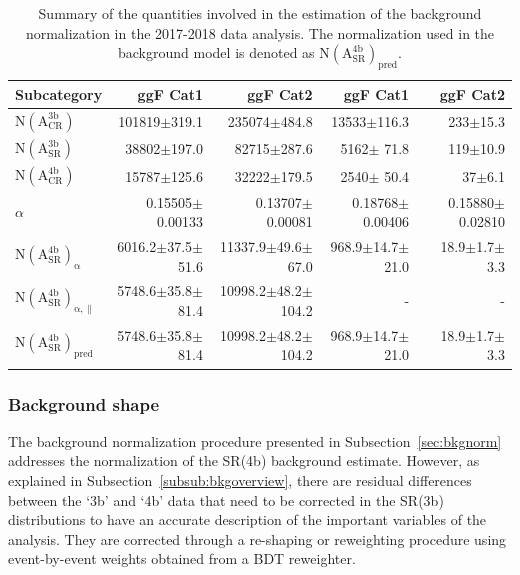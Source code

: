 \begin{table}[htb!]
\caption[Summary of the quantities involved in the estimation of the background normalization in the 2017-2018 data analysis]{\label{bkg:tab:factor2} Summary of the quantities involved in the estimation of the background normalization in the 2017-2018 data analysis. The normalization used in the background model is denoted as $\mathrm{N(A_{SR}^{4b})_{pred}}$.}
\centering
\small
\begin{tabularx}{\textwidth}{l r r r r}
    \hline
    Subcategory                    & ggF Cat1                 & ggF Cat2                & ggF Cat1                  & ggF Cat2              \\
    \hline
    $\mathrm{N(A_{CR}^{3b})}$      & 101819$\pm$319.1         & 235074$\pm$484.8        & 13533$\pm$116.3           &    233$\pm$15.3       \\
    $\mathrm{N(A_{SR}^{3b})}$      &  38802$\pm$197.0         &  82715$\pm$287.6        &  5162$\pm$ 71.8           &    119$\pm$10.9       \\
    $\mathrm{N(A_{CR}^{4b})}$      &  15787$\pm$125.6         &  32222$\pm$179.5        &  2540$\pm$ 50.4           &     37$\pm$6.1        \\
    $\alpha$          & 0.15505$\pm$0.00133      &0.13707$\pm$0.00081      &0.18768$\pm$0.00406        &0.15880$\pm$0.02810    \\
    $\mathrm{N(A_{SR}^{4b})_{\alpha}}$          &  6016.2$\pm$37.5$\pm$51.6&11337.9$\pm$49.6$\pm$67.0  &  968.9$\pm$14.7$\pm$21.0  &   18.9$\pm$1.7$\pm$3.3\\
    $\mathrm{N(A_{SR}^{4b})_{\alpha,\parallel}}$&  5748.6$\pm$35.8$\pm$81.4&10998.2$\pm$48.2$\pm$104.2 &  -  & - \\
    $\mathrm{N(A_{SR}^{4b})_{pred}}$             &  5748.6$\pm$35.8$\pm$81.4&10998.2$\pm$48.2$\pm$104.2 &  968.9$\pm$14.7$\pm$21.0  &   18.9$\pm$1.7$\pm$3.3\\   
    \hline
\end{tabularx}
\end{table}

\subsubsection{Background shape} \label{sec:bkgreshape}

The background normalization procedure presented in Subsection~\ref{sec:bkgnorm} addresses the normalization of the SR(4b) background estimate. However, as explained in Subsection~\ref{subsub:bkgoverview}, there are residual differences between the `3b' and `4b' data that need to be corrected in the SR(3b) distributions to have an accurate description of the important variables of the analysis. They are corrected through a re-shaping or reweighting procedure using event-by-event weights obtained from a BDT reweighter.

